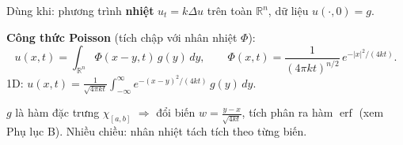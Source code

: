 \begin{dieukienbox}
Dùng khi: phương trình \textbf{nhiệt} $u_t=k\Delta u$ trên toàn $\mathbb{R}^n$, dữ liệu $u(\cdot,0)=g$.
\end{dieukienbox}

\begin{nhobox}
\textbf{Công thức Poisson} (tích chập với nhân nhiệt $\Phi$):
\[
  u(x,t)=\int_{\mathbb{R}^n}\Phi(x-y,t)\,g(y)\,dy,\qquad
  \Phi(x,t)=\frac{1}{(4\pi k t)^{n/2}}\,e^{-|x|^2/(4kt)}.
\]
1D: $\displaystyle u(x,t)=\frac{1}{\sqrt{4\pi k t}}\int_{-\infty}^{\infty} e^{-(x-y)^2/(4kt)}\,g(y)\,dy.$
\end{nhobox}

\begin{meobox}
$g$ là hàm đặc trưng $\chi_{[a,b]}$ $\Rightarrow$ đổi biến $w=\frac{y-x}{\sqrt{4kt}}$, tích phân ra
hàm $\operatorname{erf}$ (xem Phụ lục B). Nhiều chiều: nhân nhiệt tách tích theo từng biến.
\end{meobox}